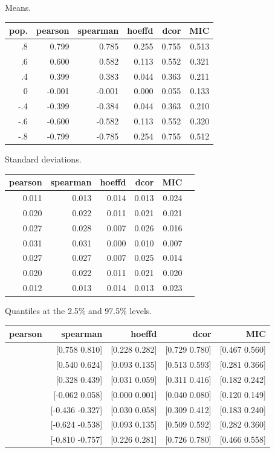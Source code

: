 \documentclass[english,nohyper,titlepage]{tufte-handout}\usepackage{graphicx, color}
\begin{document}
\footnotesize{
\indent Means.\\
\begin{tabular}{rrrrrr}
pop. & pearson & spearman & hoeffd  & dcor & MIC \\
\hline
.8 & 0.799 & 0.785 & 0.255 & 0.755 & 0.513 \\
.6 & 0.600 & 0.582 & 0.113 & 0.552 & 0.321 \\
.4 & 0.399 & 0.383 & 0.044 & 0.363 & 0.211 \\
0 & -0.001 & -0.001 & 0.000 & 0.055 & 0.133 \\
-.4 & -0.399 & -0.384 & 0.044 & 0.363 & 0.210 \\
-.6 & -0.600 & -0.582 & 0.113 & 0.552 & 0.320 \\
-.8 & -0.799 & -0.785 & 0.254 & 0.755 & 0.512 \\
\hline
\end{tabular}

\vspace{.25cm}
\noindent Standard deviations.\\
\begin{tabular}{rrrrrr}
pearson & spearman & hoeffd & dcor & MIC  \\
\hline
0.011 & 0.013 & 0.014 & 0.013 & 0.024  \\
0.020 & 0.022 & 0.011 & 0.021 & 0.021  \\
0.027 & 0.028 & 0.007 & 0.026 & 0.016  \\
0.031 & 0.031 & 0.000 & 0.010 & 0.007  \\
0.027 & 0.027 & 0.007 & 0.025 & 0.014  \\
0.020 & 0.022 & 0.011 & 0.021 & 0.020  \\
0.012 & 0.013 & 0.014 & 0.013 & 0.023  \\
\hline
\end{tabular}

\vspace{.25cm}
\noindent Quantiles at the 2.5\% and 97.5\% levels.\\
\begin{tabular}{rrrrr}

pearson & spearman & hoeffd & dcor & MIC  \\ 
\hline \relax %
[0.777 0.820] & [0.758 0.810] & [0.228 0.282] & [0.729 0.780] & [0.467 0.560] \\ \relax
[0.560 0.640] & [0.540 0.624] & [0.093 0.135] & [0.513 0.593] & [0.281 0.366] \\ \relax
[0.345 0.452] & [0.328 0.439] & [0.031 0.059] & [0.311 0.416] & [0.182 0.242] \\ \relax
[-0.062  0.060] & [-0.062 0.058] & [0.000 0.001] & [0.040 0.080] & [0.120 0.149] \\ \relax
[-0.449 -0.344] & [-0.436 -0.327] & [0.030 0.058] & [0.309 0.412] & [0.183 0.240] \\ \relax
[-0.638 -0.561] & [-0.624 -0.538] & [0.093 0.135] & [0.509 0.592] & [0.282 0.360] \\ \relax
[-0.821 -0.775] & [-0.810 -0.757] & [0.226 0.281] & [0.726 0.780] & [0.466 0.558] \\
\hline
\end{tabular}
}
\end{document}

